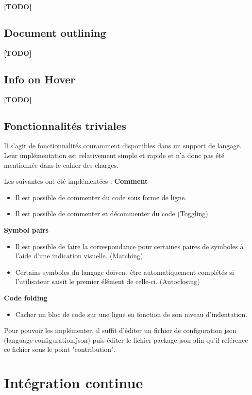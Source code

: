 \documentclass[
    iict, %
    il, %
]{heig-tb}
\begin{document}
\textbf{[TODO]}

\section{Document outlining}
\textbf{[TODO]}

\section{Info on Hover}
\textbf{[TODO]}

\section{Fonctionnalités triviales}
Il s'agit de fonctionnalités couramment disponibles dans un support de langage. Leur implémentation est relativement simple et rapide et n'a donc pas été mentionnée dans le cahier des charges.

Les suivantes ont été implémentées :
\textbf{Comment}
\begin{itemize}
    \item Il est possible de commenter du code sous forme de ligne.
    \item Il est possible de commenter et décommenter du code (Toggling)
\end{itemize}

\textbf{Symbol pairs}
\begin{itemize}
    \item Il est possible de faire la correspondance pour certaines paires de symboles à l'aide d'une indication visuelle. (Matching)
    \item Certains symboles du langage doivent être automatiquement complétés si l'utilisateur saisit le premier élément de celle-ci. (Autoclosing)
\end{itemize}

\textbf{Code folding}
\begin{itemize}
    \item Cacher un bloc de code sur une ligne en fonction de son niveau d'indentation.
\end{itemize}

Pour pouvoir les implémenter, il suffit d'éditer un fichier de configuration json (language-configuration.json) puis  éditer le fichier package.json afin qu'il référence ce fichier sous le point "contribution".

\chapter{Intégration continue}
\end{document}
